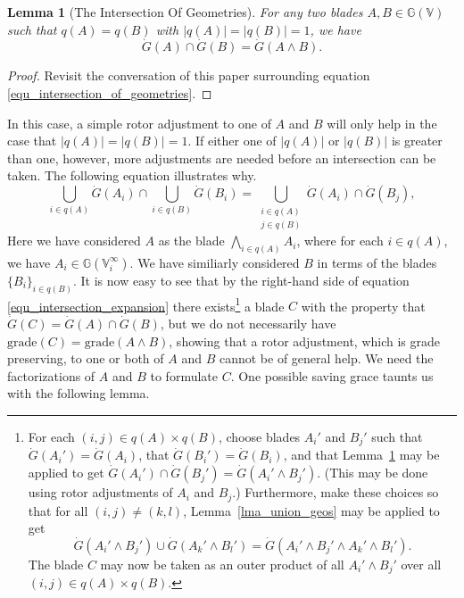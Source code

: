 \documentclass{birkjour}
\newtheorem{lem}[thm]{Lemma}
\theoremstyle{definition}
\theoremstyle{remark}
\numberwithin{equation}{section}
\newcommand{\G}{\mathbb{G}}
\newcommand{\V}{\mathbb{V}}
\newcommand{\Gi}{\dot{G}}
\begin{document}
\begin{lem}[The Intersection Of Geometries]\label{lma_intersect_geos}
For any two blades $A,B\in\G(\V)$ such that $q(A)=q(B)$
with $|q(A)|=|q(B)|=1$, we have
\begin{equation}
\Gi(A)\cap\Gi(B)=\Gi(A\wedge B).
\end{equation}
\end{lem}
\begin{proof}
Revisit the conversation of this paper surrounding equation \eqref{equ_intersection_of_geometries}.
\end{proof}
In this case, a simple rotor adjustment to one of $A$ and $B$ will only help
in the case that $|q(A)|=|q(B)|=1$.  If either one of $|q(A)|$ or $|q(B)|$
is greater than one, however, more adjustments are needed before an intersection can
be taken.  The following equation illustrates why.
\begin{equation}\label{equ_intersection_expansion}
\bigcup_{i\in q(A)}\Gi(A_i)\cap\bigcup_{i\in q(B)}\Gi(B_i) =
\bigcup_{\substack{i\in q(A)\\j\in q(B)}} \Gi(A_i)\cap \Gi(B_j),
\end{equation}
Here we have considered $A$ as the blade $\bigwedge_{i\in q(A)}A_i$, where
for each $i\in q(A)$, we have $A_i\in\G(\V_i^\infty)$.  We have similiarly
considered $B$ in terms of the blades $\{B_i\}_{i\in q(B)}$.  It is now
easy to see that by the right-hand side of equation \eqref{equ_intersection_expansion}
there exists\footnote{For each $(i,j)\in q(A)\times q(B)$, choose blades $A_i'$ and
$B_j'$ such that $\Gi(A_i')=\Gi(A_i)$, that $\Gi(B_i')=\Gi(B_i)$, and that
Lemma~\ref{lma_intersect_geos} may be applied
to get $\Gi(A_i')\cap\Gi(B_j')=\Gi(A_i'\wedge B_j')$.  (This may be done using rotor
adjustments of $A_i$ and $B_j$.)
Furthermore, make these choices so that for all $(i,j)\neq (k,l)$, Lemma~\ref{lma_union_geos}
may be applied to get
\begin{equation*}
\Gi(A_i'\wedge B_j')\cup\Gi(A_k'\wedge B_l')=\Gi(A_i'\wedge B_j'\wedge A_k'\wedge B_l').
\end{equation*}
The blade $C$ may now be taken as an outer product of all $A_i'\wedge B_j'$
over all $(i,j)\in q(A)\times q(B)$.} a blade $C$
with the property that $\Gi(C)=\Gi(A)\cap\Gi(B)$, but we do not necessarily
have $\mbox{grade}(C)=\mbox{grade}(A\wedge B)$, showing that a rotor
adjustment, which is grade preserving, to one or both of $A$ and $B$ cannot
be of general help.  We need the factorizations of $A$ and $B$ to formulate $C$.
One possible saving grace taunts us with the following lemma.
\end{document}
